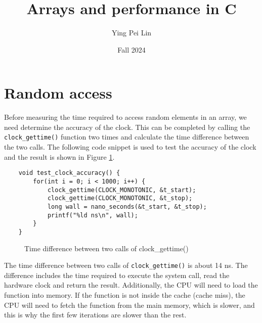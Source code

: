 \documentclass[a4paper,11pt]{article}
\begin{document}
\title{
    \textbf{Arrays and performance in C}
}
\author{Ying Pei Lin}
\date{Fall 2024}

\maketitle

\section*{Random access}

Before measuring the time required to access random elements in an array, we need determine the 
accuracy of the clock. This can be completed by calling the {\tt clock\_gettime()} function two times and 
calculate the time difference between the two calls. The following code snippet is used to test the accuracy 
of the clock and the result is shown in Figure \ref{fig:clock_accuracy}. 

\begin{verbatim}
    void test_clock_accuracy() {
        for(int i = 0; i < 1000; i++) {
            clock_gettime(CLOCK_MONOTONIC, &t_start);
            clock_gettime(CLOCK_MONOTONIC, &t_stop);
            long wall = nano_seconds(&t_start, &t_stop);
            printf("%ld ns\n", wall); 
        }
    }
\end{verbatim}

\begin{figure}[h]
    \centering
    \caption{Time difference between two calls of clock\_gettime()}
    \label{fig:clock_accuracy}
\end{figure}

The time difference between two calls of {\tt clock\_gettime()} is about 14 ns. The difference 
includes the time required to execute the system call, read the hardware clock and return the result. 
Additionally, the CPU will need to load the function into memory. If the function 
is not inside the cache (cache miss), the CPU will need to fetch the function from the main memory, 
which is slower, and this is why the first few iterations are slower than the rest.
\end{document}
